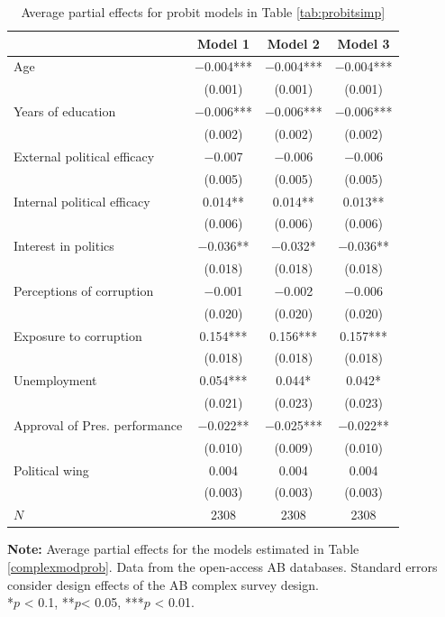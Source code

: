 \documentclass[12pt,a4]{article}\usepackage[]{graphicx}\usepackage[]{xcolor}
\begin{document}
\begin{table}[htbp]
\caption{Average partial effects for probit models in Table \ref{tab:probitsimp}}
\begin{center}
\label{tab:probitcompape}

\begin{tabular}[t]{lccc}
\toprule
  & Model 1 & Model 2 & Model 3\\
\midrule
Age & \num{-0.004}*** & \num{-0.004}*** & \num{-0.004}***\\
 & (\num{0.001}) & (\num{0.001}) & (\num{0.001})\\
Years of education & \num{-0.006}*** & \num{-0.006}*** & \num{-0.006}***\\
 & (\num{0.002}) & (\num{0.002}) & (\num{0.002})\\
External political efficacy & \num{-0.007} & \num{-0.006} & \num{-0.006}\\
 & (\num{0.005}) & (\num{0.005}) & (\num{0.005})\\
Internal political efficacy & \num{0.014}** & \num{0.014}** & \num{0.013}**\\
 & (\num{0.006}) & (\num{0.006}) & (\num{0.006})\\
Interest in politics & \num{-0.036}** & \num{-0.032}* & \num{-0.036}**\\
 & (\num{0.018}) & (\num{0.018}) & \vphantom{1} (\num{0.018})\\
Perceptions of corruption & \num{-0.001} & \num{-0.002} & \num{-0.006}\\
 & (\num{0.020}) & (\num{0.020}) & (\num{0.020})\\
Exposure to corruption & \num{0.154}*** & \num{0.156}*** & \num{0.157}***\\
 & (\num{0.018}) & (\num{0.018}) & (\num{0.018})\\
Unemployment & \num{0.054}*** & \num{0.044}* & \num{0.042}*\\
 & (\num{0.021}) & (\num{0.023}) & (\num{0.023})\\
Approval of Pres. performance & \num{-0.022}** & \num{-0.025}*** & \num{-0.022}**\\
 & (\num{0.010}) & (\num{0.009}) & (\num{0.010})\\
Political wing & \num{0.004} & \num{0.004} & \num{0.004}\\
 & (\num{0.003}) & (\num{0.003}) & (\num{0.003})\\
\midrule
$N$ & \num{2308} & \num{2308} & \num{2308}\\
\bottomrule
\end{tabular}


\vspace{0.25cm}
\end{center}
\textbf{Note:} Average partial effects for the models estimated in Table \ref{complexmodprob}. Data from the open-access AB databases. Standard errors consider design effects of the AB complex survey design.\\
*$p$ < 0.1, **$p$< 0.05, ***$p$ < 0.01.
\end{table}
\end{document}
